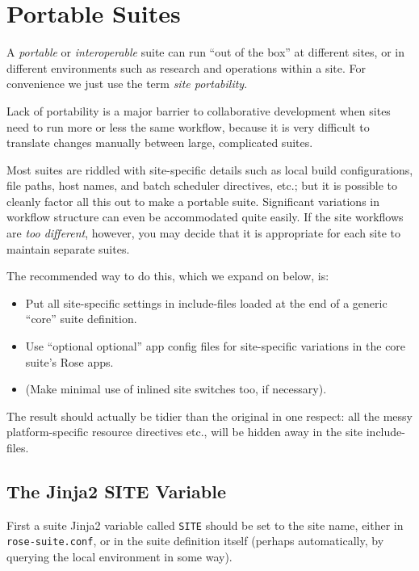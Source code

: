 \section{Portable Suites}
\label{Portable Suites}

A {\em portable} or {\em interoperable} suite can run ``out of the box'' at
different sites, or in different environments such as research and operations
within a site.  For convenience we just use the term {\em site portability}.

Lack of portability is a major barrier to collaborative development when
sites need to run more or less the same workflow, because it is very
difficult to translate changes manually between large, complicated suites.

Most suites are riddled with site-specific details such as local build
configurations, file paths, host names, and batch scheduler directives, etc.;
but it is possible to cleanly factor all this out to make a portable suite.
Significant variations in workflow structure can even be accommodated quite
easily. If the site workflows are {\em too different}, however, you may decide
that it is appropriate for each site to maintain separate suites.

The recommended way to do this, which we expand on below, is:

\begin{itemize}
  \item Put all site-specific settings in include-files loaded at the end
    of a generic ``core'' suite definition.
  \item Use ``optional optional'' app config files for site-specific variations
    in the core suite's Rose apps.
  \item (Make minimal use of inlined site switches too, if necessary).
\end{itemize}

The result should actually be tidier than the original in one respect: all
the messy platform-specific resource directives etc., will be hidden away in
the site include-files.

\subsection{The Jinja2 SITE Variable}

First a suite Jinja2 variable called \lstinline=SITE= should be set to the site
name, either in \lstinline=rose-suite.conf=, or in the suite definition itself
(perhaps automatically, by querying the local environment in some way).

